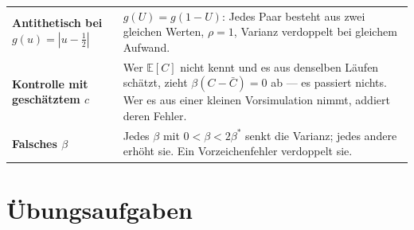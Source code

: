 \begin{warnung}
\begin{center}
{\small
\renewcommand{\arraystretch}{1.52}
\begin{tabular}{@{}P{2.8cm}P{5.8cm}@{}}
\toprule
\textbf{Antithetisch bei $g(u) = |u-\tfrac12|$} & $g(U) = g(1-U)$: Jedes Paar besteht aus zwei gleichen Werten, $\rho=1$, Varianz verdoppelt bei gleichem Aufwand.\\
\textbf{Kontrolle mit geschätztem $c$} & Wer $\mathbb E[C]$ nicht kennt und es aus denselben Läufen schätzt, zieht $\beta(C-\bar C) = 0$ ab --- es passiert nichts. Wer es aus einer kleinen Vorsimulation nimmt, addiert deren Fehler.\\
\textbf{Falsches $\beta$} & Jedes $\beta$ mit $0<\beta<2\beta^*$ senkt die Varianz; jedes andere erhöht sie. Ein Vorzeichenfehler verdoppelt sie.\\
\bottomrule
\end{tabular}}
\end{center}

\begin{center}
\begin{minipage}{0.88\textwidth}
\end{minipage}
\end{center}
\end{warnung}

\section{Übungsaufgaben}

